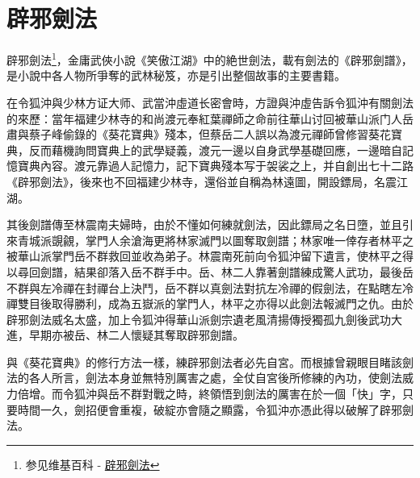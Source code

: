 \chapter{辟邪劍法}

辟邪劍法\footnote{参见维基百科 - \href{http://zh.wikipedia.org/wiki/\%E8\%BE\%9F\%E9\%82\%AA\%E5\%8A\%8D\%E6\%B3\%95}{辟邪劍法}}，金庸武俠小說《笑傲江湖》中的絶世劍法，載有劍法的《辟邪劍譜》，是小說中各人物所爭奪的武林秘笈，亦是引出整個故事的主要書籍\cite{pxjp}。

在令狐沖與少林方证大师、武當沖虛道长密會時，方證與沖虛告訴令狐沖有關劍法的來歷：當年福建少林寺的和尚渡元奉紅葉禪師之命前往華山讨回被華山派门人岳肅與蔡子峰偷錄的《葵花寶典》殘本，但蔡岳二人誤以為渡元禪師曾修習葵花寶典，反而藉機詢問寶典上的武學疑義，渡元一邊以自身武學基礎回應，一邊暗自記憶寶典內容。渡元靠過人記憶力，記下寶典殘本写于袈裟之上，并自創出七十二路《辟邪劍法》，後來也不回福建少林寺，還俗並自稱為林遠圖，開設鏢局，名震江湖。

其後劍譜傳至林震南夫婦時，由於不懂如何練就劍法，因此鏢局之名日墮，並且引來青城派覬覦，掌門人余滄海更將林家滅門以圖奪取劍譜；林家唯一倖存者林平之被華山派掌門岳不群救回並收為弟子。林震南死前向令狐沖留下遺言，使林平之得以尋回劍譜，結果卻落入岳不群手中。岳、林二人靠著劍譜練成驚人武功，最後岳不群與左冷禪在封禪台上決鬥，岳不群以真劍法對抗左冷禪的假劍法，在點瞎左冷禪雙目後取得勝利，成為五嶽派的掌門人，林平之亦得以此劍法報滅門之仇。由於辟邪劍法威名太盛，加上令狐沖得華山派劍宗遺老風清揚傳授獨孤九劍後武功大進，早期亦被岳、林二人懷疑其奪取辟邪劍譜。

與《葵花寶典》的修行方法一樣，練辟邪劍法者必先自宮。而根據曾親眼目睹該劍法的各人所言，劍法本身並無特別厲害之處，全仗自宮後所修練的內功，使劍法威力倍增。而令狐沖與岳不群對戰之時，終領悟到劍法的厲害在於一個「快」字，只要時間一久，劍招便會重複，破綻亦會隨之顯露，令狐沖亦憑此得以破解了辟邪劍法。

